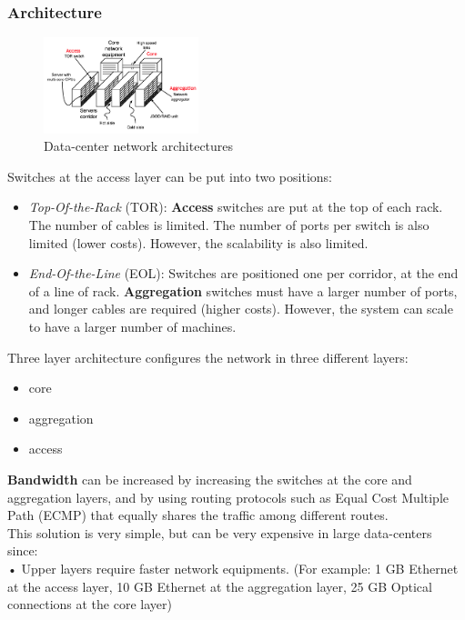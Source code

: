 \documentclass[10pt, oneside]{article}
\begin{document}
\subsubsection{Architecture}
\begin{figure}[H]
    \begin{center}
    \includegraphics[width=0.4\textwidth]{img/img22.png}
    \caption{Data-center network architectures}
    \label{fig:DS net architecture}
    \end{center}
\end{figure}
Switches at the access layer can be put into two positions:
\begin{itemize}
    \item {\sl Top-Of-the-Rack} (TOR): {\bf Access} switches are put at the top of each rack. The number of cables is limited. The number of ports per switch is also limited (lower costs). However, the scalability is also limited.
    \item {\sl End-Of-the-Line} (EOL): Switches are positioned one per corridor, at the end of a line of rack. {\bf Aggregation} switches must have a larger number of ports, and longer cables are required (higher costs). However, the system can scale to have a larger number of machines.
\end{itemize}
Three layer architecture configures the network in three different
layers:
\begin{itemize}
    \item core
    \item aggregation
    \item access
\end{itemize}
{\bf Bandwidth} can be increased by increasing the switches at the core and aggregation layers, and by using routing protocols such as Equal Cost Multiple Path (ECMP) that equally shares the traffic among different routes.\\
\newline
This solution is very simple, but can be very expensive in large data-centers since:\\
• Upper layers require faster network equipments. (For example: 1 GB Ethernet at the access layer, 10 GB Ethernet at the aggregation layer, 25 GB Optical connections at the core layer)\\
\end{document}

